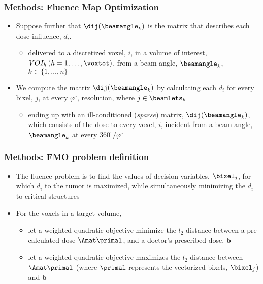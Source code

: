 \begin{frame}
\frametitle{Methods: Fluence Map Optimization}
\begin{itemize}
	\item Suppose further that $\dij(\beamangle_k)$ is the matrix that describes each dose influence, $d_i$.
	\begin{itemize}
		\item  delivered to a discretized voxel, $i$, in a volume of interest, $VOI_h \, (h = 1, \ldots, \voxtot)$, from a beam angle, $\beamangle_k$, $k \in \{1, \ldots, n\}$
	\end{itemize}
	\item We compute the matrix $\dij(\beamangle_k)$ by calculating each $d_i$ for every bixel, $j$, at every $\varphi^\circ$, resolution, where $j \in \beamlets_k$
	\begin{itemize}
		\item ending up with an ill-conditioned (\textit{sparse}) matrix, $\dij(\beamangle_k)$, which consists of the dose to every voxel, $i$, incident from a beam angle, $\beamangle_k$ at every $360^\circ/\varphi^\circ$
	\end{itemize}
\end{itemize}
\end{frame}

\begin{frame}
	\frametitle{Methods: FMO problem definition}
	\begin{itemize}
		\item The fluence problem is to find the values of decision variables, $\bixel_j$, for which $d_i$ to the tumor is maximized, while simultaneously minimizing the $d_i$ to critical structures
		\item For the voxels in a target volume, 
		
		\begin{itemize}
			\item let a weighted quadratic objective minimize the $l_2$ distance between a pre-calculated dose $\Amat \primal$, and a doctor's prescribed dose, $\textbf{b}$
			\item let a weighted quadratic objective maximizes the $l_2$ distance between $\Amat \primal$ (where $\primal$ represents the vectorized bixels, $\bixel_j$) and $\textbf{b}$
		\end{itemize}
	\end{itemize}
\end{frame}

